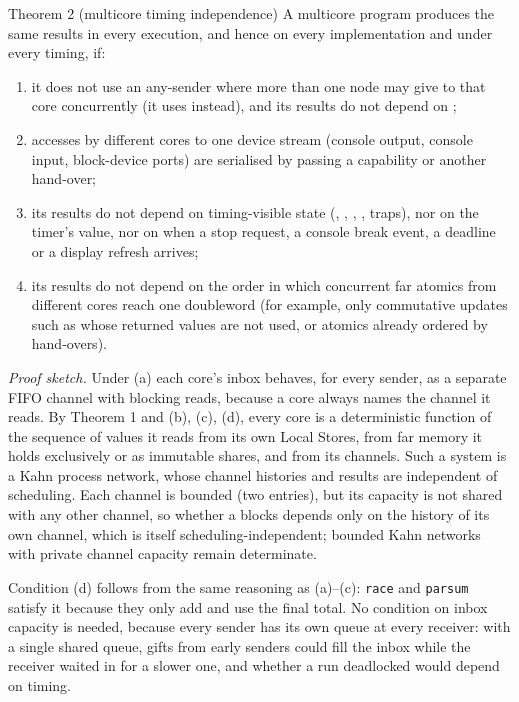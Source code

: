 \begin{rule*}{Theorem 2 (multicore timing independence)}
A multicore program produces the same results in every execution, and hence on every implementation
and under every timing, if:
\begin{enumerate}[label=(\alph*)]
\item it does not use an any-sender  where more than one node may give to that core
  concurrently (it uses  instead), and its results do not depend on ;
\item accesses by different cores to one device stream (console output, console input, block-device
  ports) are serialised by passing a capability or another hand-over;
\item its results do not depend on timing-visible state (, , ,
  ,  traps), nor on the timer's value, nor on when a stop request, a console
  break event, a deadline or a display refresh arrives;
\item its results do not depend on the order in which concurrent far atomics from different cores reach
  one doubleword (for example, only commutative updates such as  whose returned values
  are not used, or atomics already ordered by hand-overs).
\end{enumerate}
\end{rule*}

\textit{Proof sketch.} Under (a) each core's inbox behaves, for every sender, as a separate FIFO
channel with blocking reads, because a core always names the channel it reads. By Theorem 1 and (b),
(c), (d), every core is a deterministic function of the sequence of values it reads from its own Local
Stores, from far memory it holds exclusively or as immutable shares, and from its channels. Such a
system is a Kahn process network, whose channel histories and results are independent of scheduling.
Each channel is bounded (two entries), but its capacity is not shared with any other channel,
so whether a  blocks depends only on the history of its own channel, which is itself
scheduling-independent; bounded Kahn networks with private channel capacity remain determinate.
\hfill\qedbox

\begin{note}
Condition (d) follows from the same reasoning as (a)--(c): \texttt{race} and \texttt{parsum} satisfy it
because they only add and use the final total. No condition on inbox capacity is needed, because
every sender has its own queue at every receiver: with a single shared queue, gifts from early senders
could fill the inbox while the receiver waited in  for a slower one, and whether a run
deadlocked would depend on timing.
\end{note}


